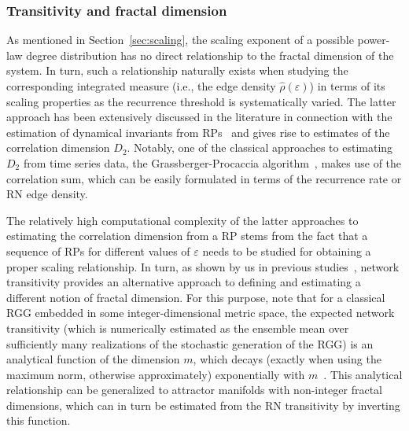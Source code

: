         \subsubsection{Transitivity and fractal dimension}

As mentioned in Section~\ref{sec:scaling}, the scaling exponent of a possible power-law degree distribution has no direct relationship to the fractal dimension of the system. In turn, such a relationship naturally exists when studying the corresponding integrated measure (i.e., the edge density $\hat{\rho}(\varepsilon)$) in terms of its scaling properties as the recurrence threshold is systematically varied. The latter approach has been extensively discussed in the literature in connection with the estimation of dynamical invariants from RPs~\cite{Faure1998,thiel2004a} and gives rise to estimates of the correlation dimension $D_2$. Notably, one of the classical approaches to estimating $D_2$ from time series data, the Grassberger-Procaccia algorithm~\cite{Grassberger1983PLA,Grassberger1983PRL}, makes use of the correlation sum, which can be easily formulated in terms of the recurrence rate or RN edge density.

The relatively high computational complexity of the latter approaches to estimating the correlation dimension from a RP stems from the fact that a sequence of RPs for different values of $\varepsilon$ needs to be studied for obtaining a proper scaling relationship. In turn, as shown by us in previous studies~\cite{Donner2011EPJB}, network transitivity provides an alternative approach to defining and estimating a different notion of fractal dimension. For this purpose, note that for a classical RGG embedded in some integer-dimensional metric space, the expected network transitivity (which is numerically estimated as the ensemble mean over sufficiently many realizations of the stochastic generation of the RGG) is an analytical function of the dimension $m$, which decays (exactly when using the maximum norm, otherwise approximately) exponentially with $m$~\cite{Dall2002}. This analytical relationship can be generalized to attractor manifolds with non-integer fractal dimensions, which can in turn be estimated from the RN transitivity by inverting this function.


